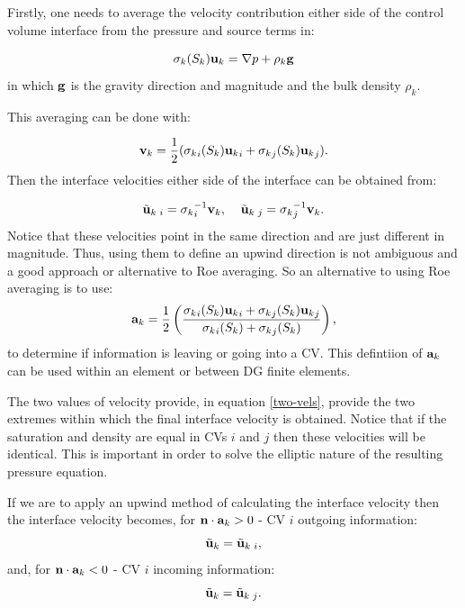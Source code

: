 Firstly, one needs to average the velocity contribution either side of the control volume
interface
from the pressure and source terms in:


\begin{equation}
\sigma_k(S_k){\bf u}_k =  \nabla p + \rho_k {\bf g}
\label{force-o}
\end{equation}
in which $\bf g$ is the gravity direction and magnitude and the bulk
density $\rho_k$.

This averaging  can be done with:


\begin{equation}
{{\bf v}}_k = \frac{1}{2} ( {\sigma_k}_i(S_k){{\bf u}_k}_i + {\sigma_k}_j(S_k){{\bf u}_k}_j ) .
\end{equation}
Then the interface velocities either side of the interface can be obtained from:

\begin{equation}
{\tilde{\bf u}_k}\:_i=   {\sigma_k}_i^{-1}  {{\bf v}}_k  , \;\;\;\;
{\tilde{\bf u}_k}\:_j =  {\sigma_k}_j^{-1}  {{\bf v}}_k    .
\label{two-vels}
\end{equation}
Notice that these velocities point in the same direction and are just different in magnitude.
Thus, using them to define an upwind direction is not ambiguous and a good approach or alternative
to Roe averaging.
So an alternative to using Roe averaging is to use:
\begin{equation}
{\bf a}_k= \frac{1}{2} \left( \frac{
 {\sigma_k}_i(S_k){{\bf u}_k}_i + {\sigma_k}_j(S_k){{\bf u}_k}_j
}
{ {\sigma_k}_i(S_k)+{\sigma_k}_j(S_k)} \right),
\end{equation}
to determine if information is leaving or going into a CV. This defintiion of ${\bf a}_k$ can be used
within an element or between DG finite elements.



The two values of velocity provide, in equation \ref{two-vels}, provide the two extremes within which the final interface
velocity is obtained. Notice that if the saturation and density are equal in
CVs $i$ and $j$ then these velocities will be identical. This is important in order to
solve the elliptic nature of the resulting pressure equation.

If we are to apply an upwind method of calculating the interface velocity then
the interface velocity becomes, for ${\bf n}\cdot {\bf a}_k>0$ - CV $i$ outgoing information:
\begin{equation}
{\tilde{\bf u}}_k = {\tilde{\bf u}}_k\:_i ,
\end{equation}
and, for ${\bf n}\cdot {\bf a}_k<0$ - CV $i$ incoming information:
\begin{equation}
{\tilde{\bf u}}_k = {\tilde{\bf u}}_k\:_j.
\end{equation}

